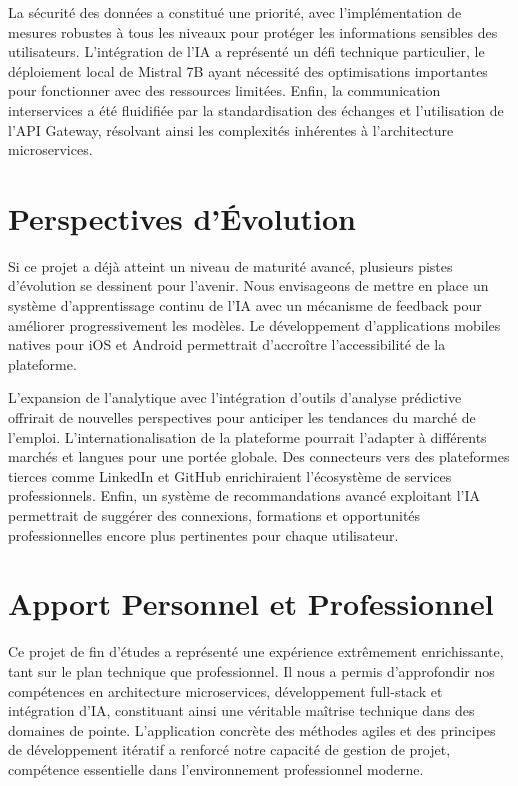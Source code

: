 La sécurité des données a constitué une priorité, avec l'implémentation de mesures robustes à tous les niveaux pour protéger les informations sensibles des utilisateurs. L'intégration de l'IA a représenté un défi technique particulier, le déploiement local de Mistral 7B ayant nécessité des optimisations importantes pour fonctionner avec des ressources limitées. Enfin, la communication interservices a été fluidifiée par la standardisation des échanges et l'utilisation de l'API Gateway, résolvant ainsi les complexités inhérentes à l'architecture microservices.

\section{Perspectives d'Évolution}
Si ce projet a déjà atteint un niveau de maturité avancé, plusieurs pistes d'évolution se dessinent pour l'avenir. Nous envisageons de mettre en place un système d'apprentissage continu de l'IA avec un mécanisme de feedback pour améliorer progressivement les modèles. Le développement d'applications mobiles natives pour iOS et Android permettrait d'accroître l'accessibilité de la plateforme.

L'expansion de l'analytique avec l'intégration d'outils d'analyse prédictive offrirait de nouvelles perspectives pour anticiper les tendances du marché de l'emploi. L'internationalisation de la plateforme pourrait l'adapter à différents marchés et langues pour une portée globale. Des connecteurs vers des plateformes tierces comme LinkedIn et GitHub enrichiraient l'écosystème de services professionnels. Enfin, un système de recommandations avancé exploitant l'IA permettrait de suggérer des connexions, formations et opportunités professionnelles encore plus pertinentes pour chaque utilisateur.

\section{Apport Personnel et Professionnel}
Ce projet de fin d'études a représenté une expérience extrêmement enrichissante, tant sur le plan technique que professionnel. Il nous a permis d'approfondir nos compétences en architecture microservices, développement full-stack et intégration d'IA, constituant ainsi une véritable maîtrise technique dans des domaines de pointe. L'application concrète des méthodes agiles et des principes de développement itératif a renforcé notre capacité de gestion de projet, compétence essentielle dans l'environnement professionnel moderne.

